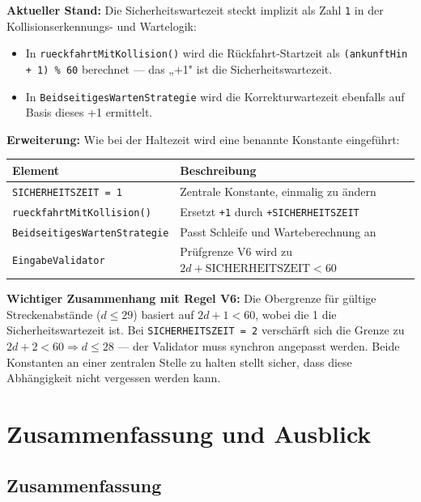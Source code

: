 \documentclass[12pt,a4paper]{article}
\begin{document}
\textbf{Aktueller Stand:}
Die Sicherheitswartezeit steckt implizit als Zahl \texttt{1} in der
Kollisionserkennungs- und Wartelogik:
\begin{itemize}
  \item In \texttt{rueckfahrtMitKollision()} wird die Rückfahrt-Startzeit
    als \texttt{(ankunftHin + 1) \% 60} berechnet — das „+1" ist die
    Sicherheitswartezeit.
  \item In \texttt{BeidseitigesWartenStrategie} wird die Korrekturwartezeit
    ebenfalls auf Basis dieses +1 ermittelt.
\end{itemize}

\textbf{Erweiterung:}
Wie bei der Haltezeit wird eine benannte Konstante eingeführt:

\begin{center}
\begin{tabular}{ll}
\toprule
\textbf{Element} & \textbf{Beschreibung} \\
\midrule
\texttt{SICHERHEITSZEIT = 1} & Zentrale Konstante, einmalig zu ändern \\
\texttt{rueckfahrtMitKollision()} & Ersetzt \texttt{+1} durch \texttt{+SICHERHEITSZEIT} \\
\texttt{BeidseitigesWartenStrategie} & Passt Schleife und Warteberechnung an \\
\texttt{EingabeValidator} & Prüfgrenze V6 wird zu $2d + \text{SICHERHEITSZEIT} < 60$ \\
\bottomrule
\end{tabular}
\end{center}

\textbf{Wichtiger Zusammenhang mit Regel V6:}
Die Obergrenze für gültige Streckenabstände ($d \leq 29$) basiert auf
$2d + 1 < 60$, wobei die 1 die Sicherheitswartezeit ist.
Bei \texttt{SICHERHEITSZEIT = 2} verschärft sich die Grenze zu
$2d + 2 < 60 \Rightarrow d \leq 28$ — der Validator muss synchron
angepasst werden.
Beide Konstanten an einer zentralen Stelle zu halten stellt sicher,
dass diese Abhängigkeit nicht vergessen werden kann.

\section{Zusammenfassung und Ausblick}
\label{sec:zusammenfassung}

\subsection{Zusammenfassung}
\end{document}
